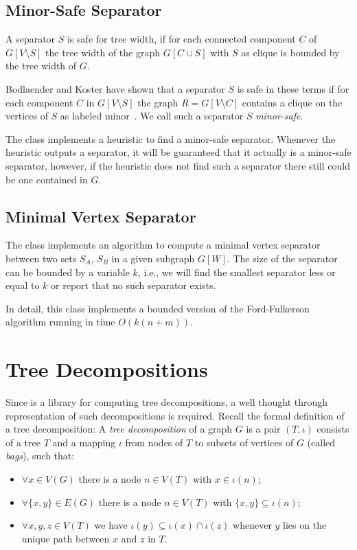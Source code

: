 \documentclass[a4paper, ukenglish, twoside, openright]{jdrasilmanual}
\begin{document}
\section{Minor-Safe Separator}
A separator \(S\) is safe for tree width, if for each connected
component \(C\) of \(G[V\setminus S]\) the tree width of the
graph \(G[C\cup S]\) with \(S\) as clique is bounded by the tree width
of \(G\).
 
Bodlaender and Koster have shown
that a separator \(S\) is safe in these terms if for each component
\(C\) in \(G[V\setminus S]\) the graph \(R=G[V\setminus C]\) contains
a clique on the vertices of \(S\) as labeled
minor~\cite{BodlaenderK2006}. We call such a separator \(S\)
\emph{minor-safe}.
 
The class  implements a heuristic to find a minor-safe
separator. Whenever the heuristic outputs a separator, it will be
guaranteed that it actually is a minor-safe separator, however, if the
heuristic does not find such a separator there still could be one
contained in \(G\).

\section{Minimal Vertex Separator}
The class  implements an algorithm to compute a minimal vertex
separator between two sets \(S_A\), \(S_B\) in a given subgraph
\(G[W]\). The size of the separator can be bounded by a variable
\(k\), i.e., we will find the smallest separator less or equal to
\(k\) or report that no such separator exists.
 
In detail, this class implements a bounded version of the
Ford-Fulkerson algorithm running in time \(O(k(n+m))\).

\chapter{Tree Decompositions}\label{chapter:treedecompositions}
Since \Jdrasil{} is a library for computing tree decompositions, a
well thought through representation of such decompositions is
required. Recall the formal definition of a tree decomposition: A
\emph{tree decomposition} of a graph $G$ is a pair $(T,\iota)$
consists of a tree $T$ and a mapping $\iota$ from nodes of $T$ to
subsets of vertices of $G$ (called \emph{bags}), such that:
\begin{itemize}
  \item $\forall x\in V(G)$ there is a node $n\in V(T)$ with $x\in\iota(n)$;
  \item $\forall \{x,y\}\in E(G)$ there is a node $n\in V(T)$ with $\{x,y\}\subseteq\iota(n)$;
  \item $\forall x,y,z\in V(T)$ we have $\iota(y)\subseteq \iota(x)\cap\iota(z)$
whenever $y$ lies on the unique path between $x$ and $z$ in $T$.
\end{itemize}
\end{document}
